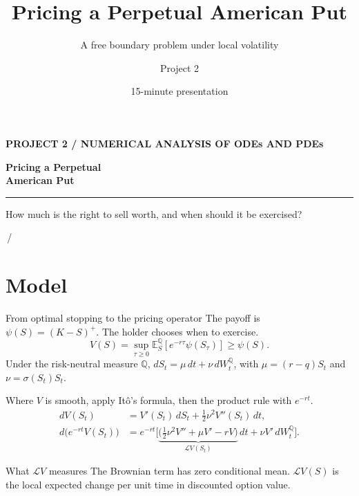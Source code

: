 \documentclass[aspectratio=169,11pt]{beamer}
\title{Pricing a Perpetual American Put}
\subtitle{A free boundary problem under local volatility}
\author{Project 2}
\institute{Numerical Analysis of ODEs and PDEs}
\date{15-minute presentation}
\newcommand{\Lop}{\mathcal{L}}
\newcommand{\E}{\mathbb{E}}
\begin{document}
\begin{frame}[plain]
  \vspace{7mm}
  {\small\bfseries\color{Teal} PROJECT 2 \quad / \quad NUMERICAL ANALYSIS OF ODEs AND PDEs\par}
  \vspace{5mm}
  {\fontsize{32}{38}\selectfont\bfseries Pricing a Perpetual\\ American Put\par}
  \vspace{3mm}
  {\large\color{Muted}\insertsubtitle\par}
  \vspace{5mm}
  {\color{Teal}\rule{28mm}{.7pt}\par}
  \vspace{3mm}
  How much is the right to sell worth, and when should it be exercised?
  \vfill
  {\scriptsize\color{Muted}\hfill\insertframenumber\,/\,\inserttotalframenumber\par}
  \vspace{2mm}
\end{frame}

\section{Model}

\begin{frame}[t]{From optimal stopping to the pricing operator}
\small
\setlength{\abovedisplayskip}{4pt}
\setlength{\belowdisplayskip}{4pt}
\setlength{\abovedisplayshortskip}{3pt}
\setlength{\belowdisplayshortskip}{3pt}
The payoff is $\psi(S)=(K-S)^+$. The holder chooses when to exercise.
\[
 V(S)=\sup_{\tau\ge0}\E_S^{\mathbb Q}\!\left[e^{-r\tau}\psi(S_\tau)\right]
 \ge \psi(S).
\]
Under the risk-neutral measure $\mathbb Q$, $dS_t=\mu\,dt+\nu\,dW_t^{\mathbb Q}$,
with $\mu=(r-q)S_t$ and $\nu=\sigma(S_t)S_t$.
\par
Where $V$ is smooth, apply Itô's formula, then the product rule with $e^{-rt}$.
\[
\begin{aligned}
 dV(S_t)
  &= V'(S_t)\,dS_t+\tfrac12\nu^2 V''(S_t)\,dt,\\[.4em]
 d\big(e^{-rt}V(S_t)\big)
  &=e^{-rt}\bigl[
      \underbrace{\big(\tfrac12\nu^2 V''+\mu V'-rV\big)}_{\Lop V(S_t)}
        \,dt+\nu V'\,dW_t^{\mathbb Q}
    \bigr].
\end{aligned}
\]
\begin{block}{What $\Lop V$ measures}
The Brownian term has zero conditional mean. $\Lop V(S)$ is the local expected change per unit time in discounted option value.
\end{block}
\end{frame}
\end{document}
